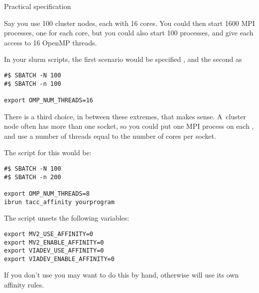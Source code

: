  {Practical specification}

Say you use 100 cluster nodes, each with 16 cores. You could then
start 1600 MPI processes, one for each core, but you could also start
100 processes, and give each access to 16 OpenMP threads.

\begin{tacc}
In your slurm scripts, the first scenario would be specified , and the second as
\begin{verbatim}
#$ SBATCH -N 100
#$ SBATCH -n 100

export OMP_NUM_THREADS=16
\end{verbatim}
\end{tacc}

There is a third choice, in between these extremes, that makes
sense. A~cluster node often has more than one socket, so you could put
one MPI process on each , and use a number of
threads equal to the number of cores per socket.

\begin{tacc}
The script for this would be:
\begin{verbatim}
#$ SBATCH -N 100
#$ SBATCH -n 200

export OMP_NUM_THREADS=8
ibrun tacc_affinity yourprogram
\end{verbatim}

The  script unsets the following variables:
\begin{verbatim}
export MV2_USE_AFFINITY=0
export MV2_ENABLE_AFFINITY=0
export VIADEV_USE_AFFINITY=0
export VIADEV_ENABLE_AFFINITY=0
\end{verbatim}
If you don't use  you may want to do this by hand,
otherwise  will use its own affinity rules.
\end{tacc}
